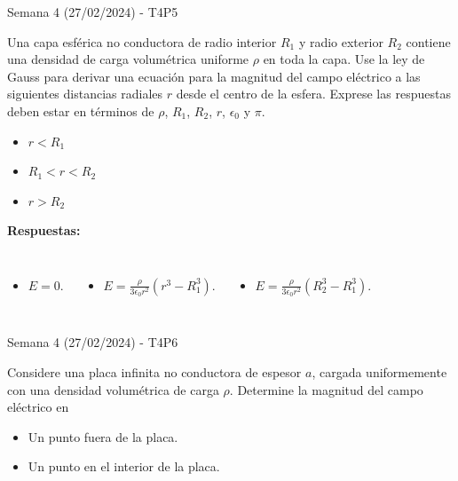 \begin{frame}{Semana 4 (27/02/2024) - T4P5}
    
    Una capa esférica no conductora de radio interior $R_1$ y radio exterior $R_2$ contiene una densidad de carga volum\'etrica uniforme $\rho$ en toda la capa. Use la ley de Gauss para derivar una ecuación para la magnitud del campo eléctrico a las siguientes distancias radiales $r$ desde el centro de la esfera. Exprese las respuestas deben estar en términos de $\rho$, $R_1$, $R_2$, $r$, $\epsilon_0$ y $\pi$.
    
    \begin{itemize}
        \item[a)] $r<R_1$
        \item[b)] $R_1<r<R_2$
        \item[c)] $r>R_2$
    \end{itemize}
    
    \pause\textbf{Respuestas:} 
    \begin{columns}
    \begin{itemize}
        \item[a)] $E=0$.
    \end{itemize}
    \begin{itemize}
        \item[b)] $E=\frac{\rho}{3\epsilon_0 r^2}\left(r^3-R_1^3\right)$.
    \end{itemize}
    \begin{itemize}
        \item[c)] $E=\frac{\rho}{3\epsilon_0 r^2}\left(R_2^3-R_1^3\right)$.
    \end{itemize}
    \end{columns}
    
\end{frame}

\begin{frame}{Semana 4 (27/02/2024) - T4P6}
    
    Considere una placa infinita no conductora de espesor $a$, cargada uniformemente con una densidad volum\'etrica de carga $\rho$. Determine la magnitud del campo el\'ectrico en
    
    \begin{itemize}
        \item[a)] Un punto fuera de la placa.
        \item[b)] Un punto en el interior de la placa.
    \end{itemize}
    
\end{frame}

